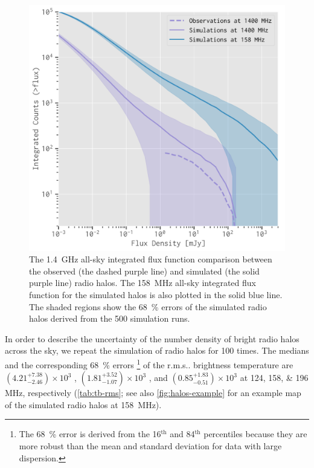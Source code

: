 \documentclass[twocolumn]{aastex62}
\makeatletter
\newcommand{\rms}{r.m.s\@ifnextchar.{}{.\@}}
\newcommand{\editone}[1]{{\leavevmode\color{cyan}#1}}
\makeatother
\begin{document}
\begin{figure}
  \centering
  \includegraphics[width=\columnwidth]{fluxfunc-simucomp-1400}
  \caption{\label{fig:halos-simucomp}%
    The \SI{1.4}{\GHz} all-sky integrated flux function comparison
    between the observed (the dashed purple line) and simulated
    (the solid purple line) radio halos.
    The \SI{158}{\MHz} all-sky integrated flux function for the simulated
    halos is also plotted in the solid blue line.
    The shaded regions show the \SI{68}{\percent} errors of the
    simulated radio halos derived from the 500 simulation runs.
  }
\end{figure}

In order to describe the uncertainty of the number density of bright
radio halos across the sky, we repeat the simulation of radio halos
for 100 times.
The medians and the corresponding \SI{68}{\percent} errors%
\footnote{The \SI{68}{\percent} error is derived from the 16$^{\text{th}}$
and 84$^{\text{th}}$ percentiles because they are more robust than the mean
and standard deviation for data with large dispersion.}
of the \rms{} brightness temperature are \editone{%
$\left(4.21_{-2.46}^{+7.38}\right) \times 10^3$ \si{\mK},
$\left(1.81_{-1.07}^{+3.52}\right) \times 10^3$ \si{\mK}, and
$\left(0.85_{-0.51}^{+1.83}\right) \times 10^3$ \si{\mK}}
at \numlist{124;158;196} \si{\MHz}, respectively
(\autoref{tab:tb-rms}; see also \autoref{fig:halos-example} for an
example map of the simulated radio halos at \SI{158}{\MHz}).
\end{document}
